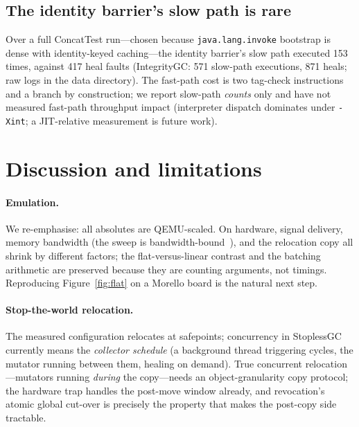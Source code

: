 \documentclass[acmsmall,nonacm,screen]{acmart}
\begin{document}
\subsection{The identity barrier's slow path is rare}
\label{sec:eval:acmp}

Over a full \textsf{ConcatTest} run---chosen because
\texttt{java.lang.invoke} bootstrap is dense with identity-keyed
caching---the identity barrier's slow path executed 153 times, against
417 heal faults (\textsf{IntegrityGC}: 571 slow-path executions, 871
heals; raw logs in the data directory). The fast-path cost is two tag-check instructions and a branch by
construction; we report slow-path \emph{counts} only and have not
measured fast-path throughput impact (interpreter dispatch dominates
under \texttt{-Xint}; a JIT-relative measurement is future work).

\section{Discussion and limitations}
\label{sec:limits}

\paragraph{Emulation.} We re-emphasise: all absolutes are QEMU-scaled.
On hardware, signal delivery, memory bandwidth (the sweep is
bandwidth-bound~\cite{cherivoke}), and the relocation copy all shrink
by different factors; the flat-versus-linear contrast and the batching
arithmetic are preserved because they are counting arguments, not
timings. Reproducing Figure~\ref{fig:flat} on a Morello board is the
natural next step.

\paragraph{Stop-the-world relocation.} The measured configuration
relocates at safepoints; concurrency in StoplessGC currently means the
\emph{collector schedule} (a background thread triggering cycles, the
mutator running between them, healing on demand). True concurrent
relocation---mutators running \emph{during} the copy---needs an
object-granularity copy protocol; the hardware trap handles the
post-move window already, and revocation's atomic global cut-over is
precisely the property that makes the post-copy side tractable.
\end{document}
